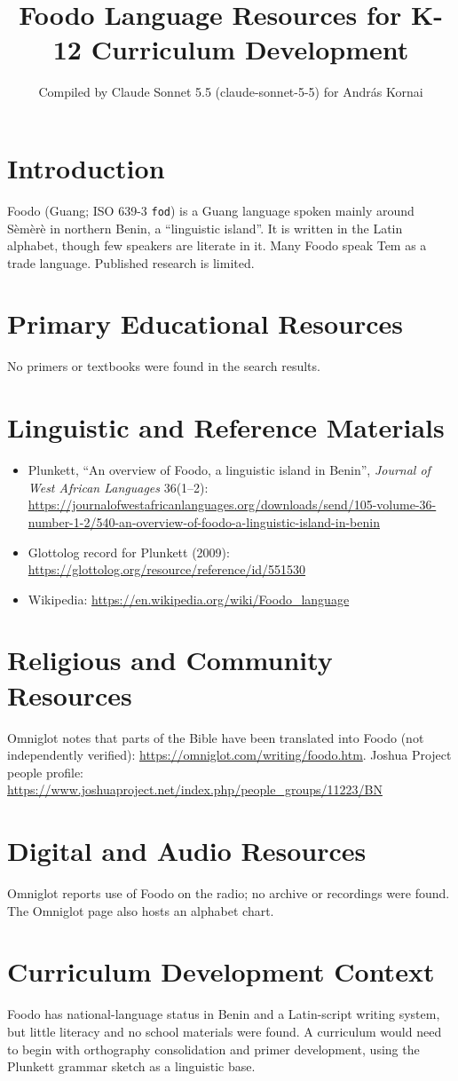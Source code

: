 \documentclass[12pt]{article}
\title{Foodo Language Resources for K-12 Curriculum Development}
\author{Compiled by Claude Sonnet 5.5 (claude-sonnet-5-5) for Andr\'as Kornai}
\date{}
\begin{document}
\maketitle

\section{Introduction}
Foodo (Guang; ISO 639-3 \texttt{fod}) is a Guang language spoken mainly around S\`em\`er\`e in northern Benin, a ``linguistic island''. It is written in the Latin alphabet, though few speakers are literate in it. Many Foodo speak Tem as a trade language. Published research is limited.

\section{Primary Educational Resources}
No primers or textbooks were found in the search results.

\section{Linguistic and Reference Materials}
\begin{itemize}
\item Plunkett, ``An overview of Foodo, a linguistic island in Benin'', \emph{Journal of West African Languages} 36(1--2): \url{https://journalofwestafricanlanguages.org/downloads/send/105-volume-36-number-1-2/540-an-overview-of-foodo-a-linguistic-island-in-benin}
\item Glottolog record for Plunkett (2009): \url{https://glottolog.org/resource/reference/id/551530}
\item Wikipedia: \url{https://en.wikipedia.org/wiki/Foodo_language}
\end{itemize}

\section{Religious and Community Resources}
Omniglot notes that parts of the Bible have been translated into Foodo (not independently verified): \url{https://omniglot.com/writing/foodo.htm}. Joshua Project people profile: \url{https://www.joshuaproject.net/index.php/people_groups/11223/BN}

\section{Digital and Audio Resources}
Omniglot reports use of Foodo on the radio; no archive or recordings were found. The Omniglot page also hosts an alphabet chart.

\section{Curriculum Development Context}
Foodo has national-language status in Benin and a Latin-script writing system, but little literacy and no school materials were found. A curriculum would need to begin with orthography consolidation and primer development, using the Plunkett grammar sketch as a linguistic base.
\end{document}
